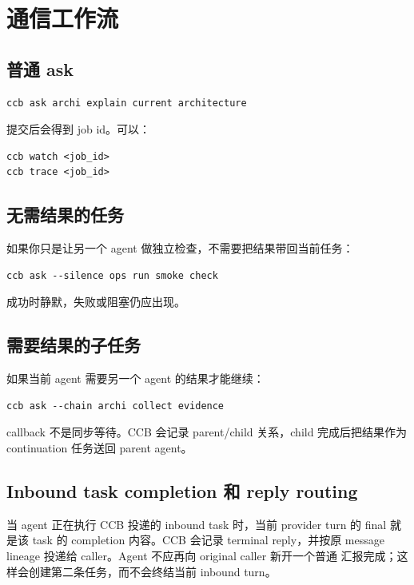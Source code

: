 \chapter{通信工作流}

\section{普通 ask}

\begin{lstlisting}
ccb ask archi explain current architecture
\end{lstlisting}

提交后会得到 job id。可以：

\begin{lstlisting}
ccb watch <job_id>
ccb trace <job_id>
\end{lstlisting}

\section{无需结果的任务}

如果你只是让另一个 agent 做独立检查，不需要把结果带回当前任务：

\begin{lstlisting}
ccb ask --silence ops run smoke check
\end{lstlisting}

成功时静默，失败或阻塞仍应出现。

\section{需要结果的子任务}

如果当前 agent 需要另一个 agent 的结果才能继续：

\begin{lstlisting}
ccb ask --chain archi collect evidence
\end{lstlisting}

callback 不是同步等待。CCB 会记录 parent/child 关系，child 完成后把结果作为 continuation 任务送回 parent agent。

\section{Inbound task completion 和 reply routing}

当 agent 正在执行 CCB 投递的 inbound task 时，当前 provider turn 的 final
就是该 task 的 completion 内容。CCB 会记录 terminal reply，并按原 message
lineage 投递给 caller。Agent 不应再向 original caller 新开一个普通
 汇报完成；这样会创建第二条任务，而不会终结当前 inbound turn。

